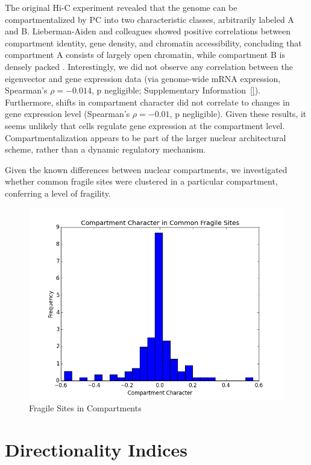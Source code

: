 The original Hi-C experiment revealed that the genome can be compartmentalized by \gls{PC} into two characteristic classes, arbitrarily
labeled A and B.  Lieberman-Aiden and colleagues showed positive correlations between compartment identity, gene density, and chromatin
accessibility, concluding that compartment A consists of largely open chromatin, while compartment B is densely packed \citep{aiden2009}.
Interestingly, we did not observe any correlation between the eigenvector and gene expression data (via genome-wide mRNA expression,
Spearman's $\rho = -0.014$, p negligible; Supplementary Information~\ref{}).  Furthermore, shifts in compartment character did not correlate to
changes in gene expression level (Spearman's $\rho = -0.01$, p negligible).  Given these results, it seems unlikely that cells regulate
gene expression at the compartment level.  Compartmentalization appears to be part of the larger nuclear architectural scheme, rather than
a dynamic regulatory mechanism.

Given the known differences between nuclear compartments, we investigated whether common fragile sites were clustered in a particular
compartment, conferring a level of fragility.

\begin{figure}[thp]
  \centering
  \caption{Fragile Sites in Compartments}\label{fig:compartmentCfs}
  \includegraphics[width=\textwidth]{./figures/results/cfs.png}
\end{figure}

\section*{Directionality Indices}

